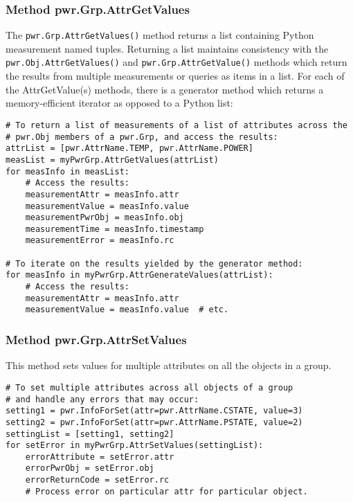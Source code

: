 \documentclass[12pt]{report} %
\begin{document}
\begin{appendices}
\subsubsection{Method pwr.Grp.AttrGetValues}
\label{meth:GrpAttrGetValues}

The \texttt{pwr.Grp.AttrGetValues()} method returns a list containing Python
measurement named tuples. Returning a list maintains consistency with the
\texttt{pwr.Obj.AttrGetValues()} and \texttt{pwr.Grp.AttrGetValue()}
methods which return the results from multiple measurements or queries as items
in a list. For each of the AttrGetValue(s) methods, there is a generator
method which returns a memory-efficient iterator as opposed to a Python list:

\begin{center}\begin{minipage}{.95\linewidth}\begin{lstlisting}
# To return a list of measurements of a list of attributes across the
# pwr.Obj members of a pwr.Grp, and access the results:
attrList = [pwr.AttrName.TEMP, pwr.AttrName.POWER]
measList = myPwrGrp.AttrGetValues(attrList)
for measInfo in measList:
    # Access the results:
    measurementAttr = measInfo.attr
    measurementValue = measInfo.value
    measurementPwrObj = measInfo.obj
    measurementTime = measInfo.timestamp
    measurementError = measInfo.rc

# To iterate on the results yielded by the generator method:
for measInfo in myPwrGrp.AttrGenerateValues(attrList):
    # Access the results:
    measurementAttr = measInfo.attr
    measurementValue = measInfo.value  # etc.
\end{lstlisting}\end{minipage}\end{center}

\subsubsection{Method pwr.Grp.AttrSetValues}
\label{meth:GrpAttrSetValues}

This method sets values for multiple attributes on all the objects in a
group.

\begin{center}\begin{minipage}{.95\linewidth}\begin{lstlisting}
# To set multiple attributes across all objects of a group
# and handle any errors that may occur:
setting1 = pwr.InfoForSet(attr=pwr.AttrName.CSTATE, value=3)
setting2 = pwr.InfoForSet(attr=pwr.AttrName.PSTATE, value=2)
settingList = [setting1, setting2]
for setError in myPwrGrp.AttrSetValues(settingList):
    errorAttribute = setError.attr
    errorPwrObj = setError.obj
    errorReturnCode = setError.rc
    # Process error on particular attr for particular object.
\end{lstlisting}\end{minipage}\end{center}


\end{appendices}
\end{document}
